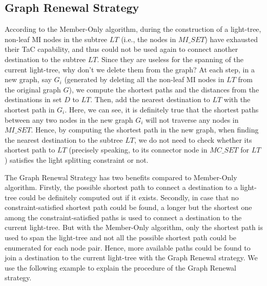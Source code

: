 \documentclass[conference]{IEEEtran}
\begin{document}
\subsection{Graph Renewal Strategy}
\label{subsec: Graph Renewal Strategy}
According to the Member-Only algorithm, during the construction of a light-tree, non-leaf MI nodes in the subtree $LT$ (i.e., the nodes in $MI\_SET$) have exhausted their TaC capability, and thus could not be used again to connect another destination to the subtree $LT$. Since they are useless for the spanning of the current light-tree, why don't we delete them from the graph? At each step, in a new graph, say $G_{i}$ (generated by deleting all the non-leaf MI nodes in $LT$ from the original graph $G$), we compute the shortest paths and the distances from the destinations in set $D$ to $LT$. Then, add the nearest destination to $LT$ with the shortest path in $G_{i}$. Here, we can see, it is definitely true that the shortest paths between any two nodes in the new graph $G_{i}$ will not traverse any nodes in $MI\_SET$. Hence, by computing the shortest path in the new graph, when finding the nearest destination to the subtree $LT$, we do not need to check whether its shortest path to $LT$ (precisely speaking, to its connector node in $MC\_SET$ for $LT$) satisfies the light splitting constraint or not.

The Graph Renewal Strategy has two benefits compared to Member-Only algorithm. Firstly, the possible shortest path to connect a destination to a light-tree could be definitely computed out if it exists. Secondly, in case that no constraint-satisfied shortest path could be found, a longer but the shortest one among the constraint-satisfied paths is used to connect a destination to the current light-tree. But with the Member-Only algorithm, only the shortest path is used to span the light-tree and not all the possible shortest path could be enumerated for each node pair. Hence, more available paths could be found to join a destination to the current light-tree with the Graph Renewal strategy. We use the following example to explain the procedure of the Graph Renewal strategy.
\end{document}
